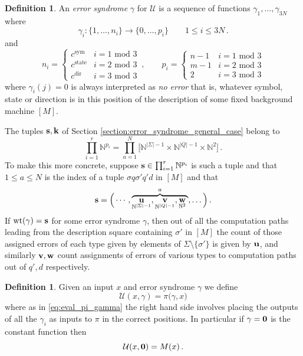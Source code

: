 \documentclass[english,letter paper,12pt,reqno]{article}
\theoremstyle{definition}
\newtheorem{definition}[theorem]{Definition}
\def\be{\begin{equation}}
\def\ee{\end{equation}}
\newcommand{\lto}{\longrightarrow}
\begin{document}
\begin{definition}\label{defn:error_syndrome_utm} An \emph{error syndrome} $\gamma$ for $\mathcal{U}$ is a sequence of functions $\gamma_1,\ldots,\gamma_{3N}$ where
\[
\gamma_i: \{ 1, \ldots, n_i \} \lto \{ 0, \ldots, p_i \} \qquad 1 \le i \le 3N\,.
\]
and
\[
n_i = \begin{cases} c^{\text{sym}} & i = 1 \text{ mod } 3\\
c^{\text{state}} & i = 2 \text{ mod } 3\\
c^{\text{dir}} & i = 3 \text{ mod } 3
\end{cases}\,,
\qquad
p_i = \begin{cases} n - 1 & i = 1 \text{ mod } 3\\
m - 1 & i = 2 \text{ mod } 3\\
2 & i = 3 \text{ mod } 3
\end{cases}
\]
where $\gamma_i(j) = 0$ is always interpreted as \emph{no error} that is, whatever symbol, state or direction is in this position of the description of some fixed background machine $[M]$.
\end{definition}

The tuples $\bold{s}, \bold{k}$ of Section \ref{section:error_syndrome_general_case} belong to
\be
\prod_{i=1}^r \mathbb{N}^{p_i} = \prod_{a=1}^N\big[ \mathbb{N}^{|\Sigma|-1} \times \mathbb{N}^{|Q|-1} \times \mathbb{N}^2 \big]\,.
\ee
To make this more concrete, suppose $\bold{s} \in \prod_{i=1}^r \mathbb{N}^{p_i}$ is such a tuple and that $1 \le a \le N$ is the index of a tuple $\sigma q \sigma' q' d$ in $[M]$ and that
\be
\bold{s} = \Big( \cdots, \overset{a}{\overbrace{\underset{\mathbb{N}^{|\Sigma|-1}}{\bold{u}}, \underset{\mathbb{N}^{|Q|-1}}{\bold{v}}, \underset{\mathbb{N}^2}{\bold{w}}\;}}, \ldots \Big)\,.
\ee
If $\operatorname{wt}(\gamma) = \bold{s}$ for some error syndrome $\gamma$, then out of all the computation paths leading from the description square containing $\sigma'$ in $[M]$ the count of those assigned errors of each type given by elements of $\Sigma \setminus \{ \sigma' \}$ is given by $\bold{u}$, and similarly $\bold{v}, \bold{w}$ count assignments of errors of various types to computation paths out of $q', d$ respectively.

\begin{definition}\label{defn:uxgamma}
Given an input $x$ and error syndrome $\gamma$ we define
\begin{equation}\label{eq:mathcalU_x_gamma}
\mathcal{U}(x,\gamma) = \pi\big( \gamma, x \big)
\end{equation}
where as in \eqref{eq:eval_pi_gamma} the right hand side involves placing the outputs of all the $\gamma_i$ as inputs to $\pi$ in the correct positions. In particular if $\gamma = \bold{0}$ is the constant function then
\[
\mathcal{U}(x, \bold{0}) = M(x)\,.
\]
\end{definition}
\end{document}
